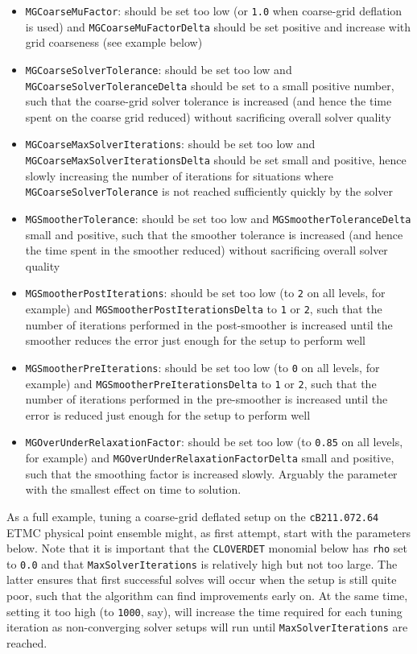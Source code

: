 \begin{itemize}
  \item \texttt{MGCoarseMuFactor}: should be set too low (or \texttt{1.0} when coarse-grid deflation is used) and \texttt{MGCoarseMuFactorDelta} should be set positive and increase with grid coarseness (see example below)
  \item \texttt{MGCoarseSolverTolerance}: should be set too low and \texttt{MGCoarseSolverToleranceDelta} should be set to a small positive number, such that the coarse-grid solver tolerance is increased (and hence the time spent on the coarse grid reduced) without sacrificing overall solver quality
  \item \texttt{MGCoarseMaxSolverIterations}: should be set too low and \\
    \texttt{MGCoarseMaxSolverIterationsDelta} should be set small and positive, hence slowly increasing the number of iterations for situations where \texttt{MGCoarseSolverTolerance} is not reached sufficiently quickly by the solver
  \item \texttt{MGSmootherTolerance}: should be set too low and \texttt{MGSmootherToleranceDelta} small and positive, such that the smoother tolerance is increased (and hence the time spent in the smoother reduced) without sacrificing overall solver quality
  \item \texttt{MGSmootherPostIterations}: should be set too low (to \texttt{2} on all levels, for example) and \texttt{MGSmootherPostIterationsDelta} to \texttt{1} or \texttt{2}, such that the number of iterations performed in the post-smoother is increased until the smoother reduces the error just enough for the setup to perform well
  \item \texttt{MGSmootherPreIterations}: should be set too low (to \texttt{0} on all levels, for example) and \texttt{MGSmootherPreIterationsDelta} to \texttt{1} or \texttt{2}, such that the number of iterations performed in the pre-smoother is increased until the error is reduced just enough for the setup to perform well
  \item \texttt{MGOverUnderRelaxationFactor}: should be set too low (to \texttt{0.85} on all levels, for example) and \texttt{MGOverUnderRelaxationFactorDelta} small and positive, such that the smoothing factor is increased slowly. Arguably the parameter with the smallest effect on time to solution.
\end{itemize}

As a full example, tuning a coarse-grid deflated setup on the \texttt{cB211.072.64} ETMC physical point ensemble might, as first attempt, start with the parameters below.
Note that it is important that the \texttt{CLOVERDET} monomial below has \texttt{rho} set to \texttt{0.0} and that \texttt{MaxSolverIterations} is relatively high but not too large.
The latter ensures that first successful solves will occur when the setup is still quite poor, such that the algorithm can find improvements early on.
At the same time, setting it too high (to \texttt{1000}, say), will increase the time required for each tuning iteration as non-converging solver setups will run until \texttt{MaxSolverIterations} are reached.

